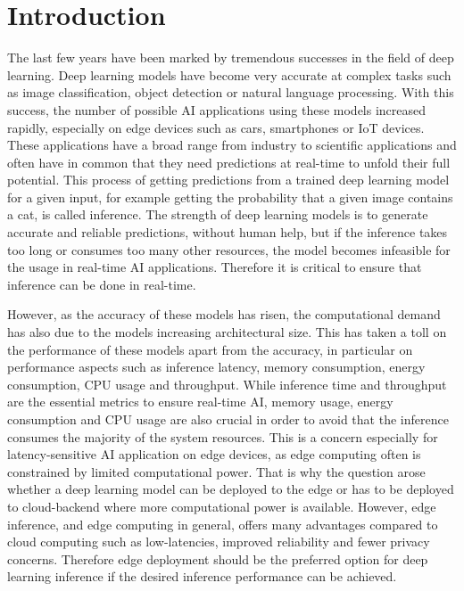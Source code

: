 \chapter{Introduction}


The last few years have been marked by tremendous successes in the field of deep learning.
Deep learning models have become very accurate at complex tasks such as image classification, object detection or natural language processing. 
With this success, the number of possible AI applications using these models increased rapidly, especially on edge devices such as cars, smartphones or IoT devices.
These applications have a broad range from industry to scientific applications and often have in common that they need predictions at real-time to unfold their full potential.
This process of getting predictions from a trained deep learning model for a given input, for example getting the probability that a given image contains a cat, is called inference.
The strength of deep learning models is to generate accurate and reliable predictions, without human help, but if the inference takes too long or consumes too many other resources, the model becomes infeasible for the usage in real-time AI applications.
Therefore it is critical to ensure that inference can be done in real-time.

However, as the accuracy of these models has risen, the computational demand has also due to the models increasing architectural size.
This has taken a toll on the performance of these models apart from the accuracy, in particular on performance aspects such as inference latency, memory consumption, energy consumption, CPU usage and throughput. 
While inference time and throughput are the essential metrics to ensure real-time AI, memory usage, energy consumption and CPU usage are also crucial in order to avoid that the inference consumes the majority of the system resources.
This is a concern especially for latency-sensitive AI application on edge devices, as edge computing often is constrained by limited computational power. 
That is why the question arose whether a deep learning model can be deployed to the edge or has to be deployed to cloud-backend where more computational power is available.
However, edge inference, and edge computing in general, offers many advantages compared to cloud computing such as low-latencies, improved reliability and fewer privacy concerns\cite{Mor:2018:EC:3305263.3313377}.
Therefore edge deployment should be the preferred option for deep learning inference if the desired inference performance can be achieved.



